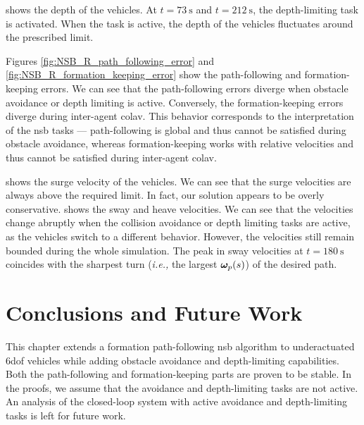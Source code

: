 shows the depth of the vehicles.
At $t = \SI{73}{\second}$ and $t = \SI{212}{\second}$, the depth-limiting task is activated.
When the task is active, the depth of the vehicles fluctuates around the prescribed limit.



Figures \ref{fig:NSB_R_path_following_error} and \ref{fig:NSB_R_formation_keeping_error} show the path-following and formation-keeping errors.
We can see that the path-following errors diverge when obstacle avoidance or depth limiting is active.
Conversely, the formation-keeping errors diverge during inter-agent \gls{colav}.
This behavior corresponds to the interpretation of the \gls{nsb} tasks --- path-following is global and thus cannot be satisfied during obstacle avoidance, whereas formation-keeping works with relative velocities and thus cannot be satisfied during inter-agent \gls{colav}.



 shows the surge velocity of the vehicles.
We can see that the surge velocities are always above the required limit.
In fact, our solution appears to be overly conservative.
 shows the sway and heave velocities.
We can see that the velocities change abruptly when the collision avoidance or depth limiting tasks are active, as the vehicles switch to a different behavior.
However, the velocities still remain bounded during the whole simulation.
The peak in sway velocities at $t = \SI{180}{\second}$ coincides with the sharpest turn (\emph{i.e.,} the largest $\bm{\omega}_p(s)$) of the desired path.


\section{Conclusions and Future Work}
\label{sec:NSB_R_conclusion}

This chapter extends a formation path-following \gls{nsb} algorithm to underactuated 6\gls{dof}  vehicles while adding obstacle avoidance and depth-limiting capabilities. 
Both the path-following and formation-keeping parts are proven to be stable.     
In the proofs, we assume that the avoidance and depth-limiting tasks are not active.
An analysis of the closed-loop system with active avoidance and depth-limiting tasks is left for future work.
